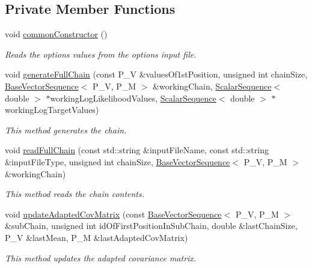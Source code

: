 \subsection*{Private Member Functions}
\begin{DoxyCompactItemize}
\item 
void \hyperlink{class_q_u_e_s_o_1_1_metropolis_hastings_s_g_a38f0ec3feee117f6abe20c0a806f9c0a}{common\-Constructor} ()
\begin{DoxyCompactList}\small\item\em Reads the options values from the options input file. \end{DoxyCompactList}\item 
void \hyperlink{class_q_u_e_s_o_1_1_metropolis_hastings_s_g_af904814eb149a8fcc8ca346f2c254337}{generate\-Full\-Chain} (const P\-\_\-\-V \&values\-Of1st\-Position, unsigned int chain\-Size, \hyperlink{class_q_u_e_s_o_1_1_base_vector_sequence}{Base\-Vector\-Sequence}$<$ P\-\_\-\-V, P\-\_\-\-M $>$ \&working\-Chain, \hyperlink{class_q_u_e_s_o_1_1_scalar_sequence}{Scalar\-Sequence}$<$ double $>$ $\ast$working\-Log\-Likelihood\-Values, \hyperlink{class_q_u_e_s_o_1_1_scalar_sequence}{Scalar\-Sequence}$<$ double $>$ $\ast$working\-Log\-Target\-Values)
\begin{DoxyCompactList}\small\item\em This method generates the chain. \end{DoxyCompactList}\item 
void \hyperlink{class_q_u_e_s_o_1_1_metropolis_hastings_s_g_ad1a6f23afa254985240949b8bbfb0c59}{read\-Full\-Chain} (const std\-::string \&input\-File\-Name, const std\-::string \&input\-File\-Type, unsigned int chain\-Size, \hyperlink{class_q_u_e_s_o_1_1_base_vector_sequence}{Base\-Vector\-Sequence}$<$ P\-\_\-\-V, P\-\_\-\-M $>$ \&working\-Chain)
\begin{DoxyCompactList}\small\item\em This method reads the chain contents. \end{DoxyCompactList}\item 
void \hyperlink{class_q_u_e_s_o_1_1_metropolis_hastings_s_g_a8b6571483a26c8ce1783519c43ed55a4}{update\-Adapted\-Cov\-Matrix} (const \hyperlink{class_q_u_e_s_o_1_1_base_vector_sequence}{Base\-Vector\-Sequence}$<$ P\-\_\-\-V, P\-\_\-\-M $>$ \&sub\-Chain, unsigned int id\-Of\-First\-Position\-In\-Sub\-Chain, double \&last\-Chain\-Size, P\-\_\-\-V \&last\-Mean, P\-\_\-\-M \&last\-Adapted\-Cov\-Matrix)
\begin{DoxyCompactList}\small\item\em This method updates the adapted covariance matrix. \end{DoxyCompactList}\item 

\end{DoxyCompactItemize}
